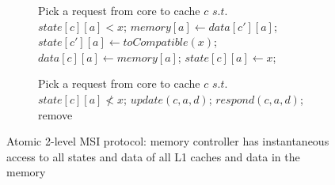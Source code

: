 \begin{figure}
\begin{figure}[H]
\begin{boxedminipage}{\linewidth}
\begin{algorithmic}
\State Pick a request  from core to cache $c$ \newline
$s.t.$ $state[c][a] < x$;
    \State $memory[a] \gets data[c'][a]$;
  \EndIf
  \State $state[c'][a] \gets toCompatible(x)$;
\EndFor
{}
  \State $data[c][a] \gets memory[a]$;
\EndIf
\State $state[c][a] \gets x$;
\end{algorithmic}
\end{boxedminipage}
\label{alg:mem}
\end{figure}
\begin{figure}[H]
\begin{boxedminipage}{\linewidth}
\begin{algorithmic}
\State Pick a request  from core to cache $c$ \newline
$s.t.$ $state[c][a] \not< x$;
  \State $update(c, a, d)$;
  \State $respond(c, a, d)$;
\EndIf
\State remove 
\end{algorithmic}
\end{boxedminipage}
\end{figure}
\caption{Atomic 2-level MSI protocol: memory controller has instantaneous
access to all states and data of all L1 caches and data in the memory}
\label{alg:msi-easy}
\end{figure}

